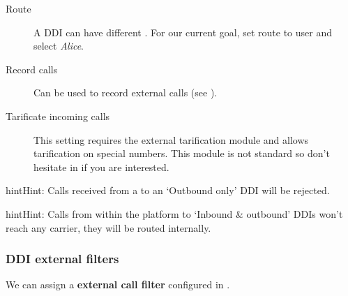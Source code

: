 \documentclass[letterpaper,10pt,english]{sphinxmanual}
\begin{document}
\begin{description}
\item[{Route}] \leavevmode{}\label{administration_portal/client/vpbx/ddis:term-route}
A DDI can have different {\hyperref[administration_portal/client/vpbx/ddis:routing\string-logics]{}}. For our
current goal, set route to user and select \emph{Alice}.

\item[{Record calls}] \leavevmode{}\label{administration_portal/client/vpbx/ddis:term-record-calls}
Can be used to record external calls (see {\hyperref[administration_portal/client/vpbx/calls/call_recordings:call\string-recordings]{}}).

\item[{Tarificate incoming calls}] \leavevmode{}\label{administration_portal/client/vpbx/ddis:term-tarificate-incoming-calls}
This setting requires the external tarification module and allows
tarification on special numbers. This module is not standard so don't
hesitate in {\hyperref[basic_concepts/intro/getting_help:getting\string-help]{}} if you are interested.

\end{description}

\begin{notice}{hint}{Hint:}
Calls received from a {\hyperref[administration_portal/brand/providers/ddi_providers:ddi\string-providers]{}} to an `Outbound only'
DDI will be rejected.
\end{notice}

\begin{notice}{hint}{Hint:}
Calls from within the platform to `Inbound \& outbound' DDIs won't reach
any carrier, they will be routed internally.
\end{notice}


\subsubsection{DDI external filters}
\label{administration_portal/client/vpbx/ddis:ddi-external-filters}
We can assign a \textbf{external call filter} configured in {\hyperref[administration_portal/client/vpbx/routing_tools/external_call_filters:external\string-call\string-filters]{}}.
\end{document}
